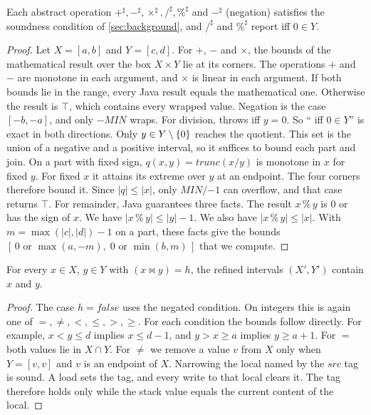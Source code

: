 \begin{theorem}
\label{thm:intervals}
Each abstract operation $+^\sharp, -^\sharp, \times^\sharp, /^\sharp, \%^\sharp$ and
$-^\sharp$ (negation) satisfies the soundness condition of \cref{sec:background}, and
$/^\sharp$ and $\%^\sharp$ report \dbz{} iff $0 \in Y$.
\end{theorem}
\begin{proof}
Let $X = [a,b]$ and $Y = [c,d]$. For $+$, $-$ and $\times$, the bounds of the mathematical
result over the box $X \times Y$ lie at its corners. The operations $+$ and $-$ are monotone in
each argument, and $\times$ is linear in each argument. If both bounds lie in the 
range, every Java result equals the mathematical one. Otherwise the result is $\top$, which
contains every wrapped value. Negation is the case $[-b,-a]$, and only $-\mathit{MIN}$ wraps.
For division,  throws iff $y = 0$. So ``\dbz{} iff $0 \in Y$'' is exact in both
directions. Only $y \in Y \setminus \left\{0\right\}$ reaches the quotient. This set is the union of a
negative and a positive interval, so it suffices to bound each part and join. On a part with
fixed sign, $q(x,y) = \mathit{trunc}(x/y)$ is monotone in $x$ for fixed $y$. For fixed $x$ it
attains its extreme over $y$ at an endpoint. The four corners therefore bound it. Since
$|q| \le |x|$, only $\mathit{MIN}/{-1}$ can overflow, and that case returns $\top$. For
remainder, Java guarantees three facts. The result $x \,\%\, y$ is $0$ or has the sign of $x$.
We have $|x \,\%\, y| \le |y| - 1$. We also have $|x \,\%\, y| \le |x|$. With
$m = \max(|c|,|d|) - 1$ on a part, these facts give the bounds
$[\,0 \text{ or } \max(a,-m),\; 0 \text{ or } \min(b,m)\,]$ that we compute.
\end{proof}

\begin{lemma}
\label{lem:refine}
For every $x \in X$, $y \in Y$ with $(x \bowtie y) = h$, the refined intervals
$(X', Y')$ contain $x$ and $y$.
\end{lemma}
\begin{proof}
The case $h = \mathit{false}$ uses the negated condition. On integers this is again one of
$=, \neq, <, \le, >, \ge$. For each condition the bounds follow directly. For example,
$x < y \le d$ implies $x \le d - 1$, and $y > x \ge a$ implies $y \ge a + 1$. For $=$ both
values lie in $X \cap Y$. For $\neq$ we remove a value $v$ from $X$ only when $Y = [v,v]$ and
$v$ is an endpoint of $X$. Narrowing the local named by the $\mathit{src}$ tag is sound. A load
sets the tag, and every write to that local clears it. The tag therefore holds only while the
stack value equals the current content of the local.
\end{proof}

